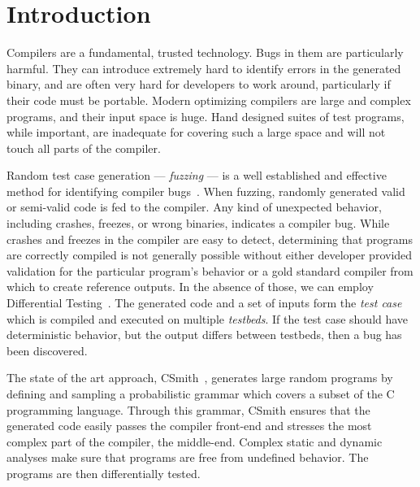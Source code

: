 \section{Introduction}\label{sec:intro}

\noindent
Compilers are a fundamental, trusted technology. Bugs in them are particularly harmful. They can introduce extremely hard to identify errors in the generated binary, and are often very hard for developers to work around, particularly if their code must be portable. Modern optimizing compilers are large and complex programs, and their input space is huge. Hand designed suites of test programs, while important, are inadequate for covering such a large space and will not touch all parts of the compiler.


Random test case generation --- \emph{fuzzing} --- is a well established and effective method for identifying compiler bugs~\cite{Chen2014a,Chen2013,Kossatchev2005}. When fuzzing, randomly generated valid or semi-valid code is fed to the compiler. Any kind of unexpected behavior, including crashes, freezes, or wrong binaries, indicates a compiler bug. While crashes and freezes in the compiler are easy to detect, determining that programs are correctly compiled is not generally possible without either developer provided validation for the particular program's behavior or a gold standard compiler from which to create reference outputs. In the absence of those, we can employ Differential Testing~\cite{McKeeman1998}. The generated code and a set of inputs form the \emph{test case} which is compiled and executed on multiple \emph{testbeds}. If the test case should have deterministic behavior, but the output differs between testbeds, then a bug has been discovered.

The state of the art approach, CSmith~\cite{Yang2011}, generates large random programs by defining and sampling a probabilistic grammar which covers a subset of the C programming language. Through this grammar, CSmith ensures that the generated code easily passes the compiler front-end and stresses the most complex part of the compiler, the middle-end.  Complex static and dynamic analyses make sure that programs are free from undefined behavior. The programs are then differentially tested.

